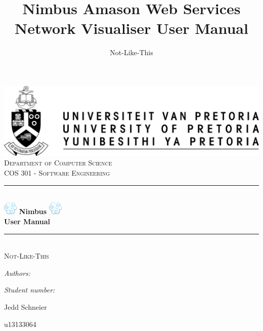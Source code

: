 \documentclass[hidelinks,a4paper,12pt]{article}
\author{Not-Like-This}
\title{ Nimbus Amason Web Services Network Visualiser User Manual}
\newcommand{\HRule}{\rule{\linewidth}{0.5mm}}
\begin{document}
\setlength{\parskip}{6pt}

\begin{titlepage}

\begin{center}
\includegraphics[width=1\textwidth]{./images/up-logo.jpg}\\[0.4cm]    
\textsc{\LARGE Department of Computer Science}\\[1.5cm]
\textsc{\Large COS 301 - Software Engineering}\\[0.5cm]
\HRule \\[0.4cm]
\includegraphics[width=0.05\textwidth]{./images/logo.png}
{ \huge \bfseries Nimbus}
\includegraphics[width=0.05\textwidth]{./images/logo.png}\\[0.4cm]   
{ \huge \bfseries User Manual}\\[0.4cm]
\HRule \\[0.4cm]
\textsc{\Large Not-Like-This}\\[0.5cm]
\begin{minipage}{0.4\textwidth}
\begin{flushleft} \large
\emph{Authors:}
\end{flushleft}
\end{minipage}
\begin{minipage}{0.4\textwidth}
\begin{flushright} \large
\emph{Student number:}
\end{flushright}
\end{minipage}

\begin{minipage}{0.4\textwidth}
\begin{flushleft} \large
Jedd {Schneier}
\end{flushleft}
\end{minipage}
\begin{minipage}{0.4\textwidth}
\begin{flushright} \large
\emph{}
u13133064
\end{flushright}
\end{minipage}


\end{center}
\end{titlepage}
\end{document}
